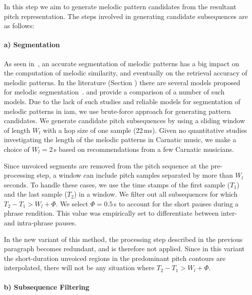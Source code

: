 In this step we aim to generate melodic pattern candidates from the resultant pitch representation. The steps involved in generating candidate subsequences are as follows:

\paragraph{a) Segmentation} 

As seen in~, an accurate segmentation of melodic patterns has a big impact on the computation of melodic similarity, and eventually on the retrieval accuracy of melodic patterns. In the literature (Section ) there are several models proposed for melodic segmentation~\citep{Cambouropoulos2006,muller2009robust,cambouropoulos2001local}. \cite{pearce2008comparison} and \cite{rodriguez2014comparing} provide a comparison of a number of such models. Due to the lack of such studies and reliable models for segmentation of melodic patterns in \gls{iam}, we use brute-force approach for generating pattern candidates. We generate candidate pitch subsequences by using a sliding window of length $W_l$ with a hop size of one sample (22\,ms). Given no quantitative studies investigating the length of the melodic patterns in Carnatic music, we make a choice of $W_l = 2$\,s based on recommendations from a few Carnatic musicians.

Since unvoiced segments are removed from the pitch sequence at the pre-processing step, a window can include pitch samples separated by more than $W_l$ seconds. To handle these cases, we use the time stamps of the first sample ($T_1$) and the last sample ($T_2$) in a window. We filter out all subsequences for which $T_2-T_1 > W_l + \Phi$. We select $\Phi =0.5$\,s to account for the short pauses during a phrase rendition. This value was empirically set to differentiate between inter- and intra-phrase pauses. 

In the new variant of this method, the processing step described in the previous paragraph becomes redundant, and is therefore not applied. Since in this variant the short-duration unvoiced regions in the predominant pitch contours are interpolated, there will not be any situation where $T_2-T_1 > W_l + \Phi$. 


\paragraph{b) Subsequence Filtering} 

